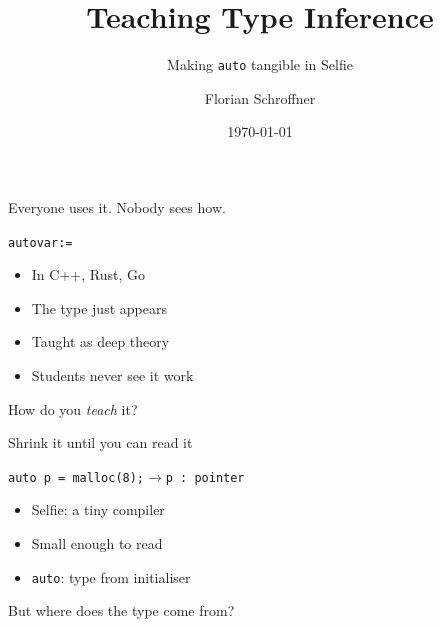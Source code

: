 \documentclass[aspectratio=169]{beamer}
\title{Teaching Type Inference}
\subtitle{Making \texttt{auto} tangible in Selfie}
\author{Florian Schroffner}
\institute{University of Salzburg}
\date{\today}
\begin{document}
\begin{frame}[plain,shrink=10]
  \titlepage
\end{frame}

\begin{frame}{Everyone uses it. Nobody sees how.}
  \begin{center}
    \Large
    \texttt{auto}\quad\texttt{var}\quad\texttt{:=}
  \end{center}

  \vfill

  \begin{itemize}
    \item In C++, Rust, Go
    \item The type just appears
    \item Taught as deep theory
    \item Students never see it work
  \end{itemize}

  \vfill

  \begin{center}
    \alert{\Large How do you \emph{teach} it?}
  \end{center}
\end{frame}

\begin{frame}{Shrink it until you can read it}
  \begin{center}
    \Large
    \texttt{auto p = malloc(8);}\quad$\longrightarrow$\quad\texttt{p : pointer}
  \end{center}

  \vfill

  \begin{itemize}
    \item Selfie: a tiny compiler
    \item Small enough to read
    \item \texttt{auto}: type from initialiser
  \end{itemize}

  \vfill

  \begin{center}
    \alert{\Large But where does the type come from?}
  \end{center}
\end{frame}
\end{document}
